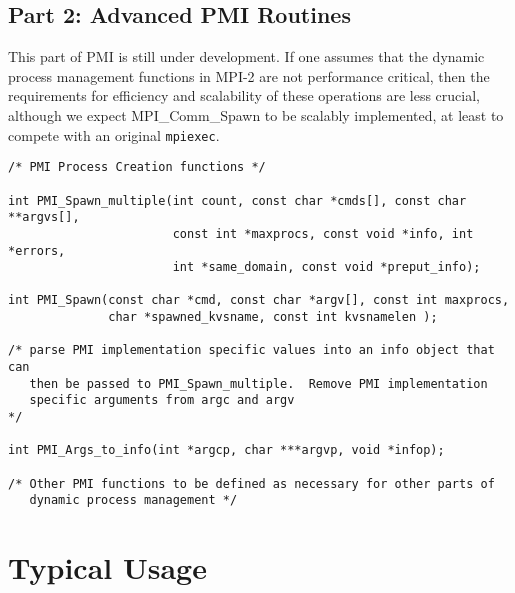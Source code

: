 \documentclass[11pt]{article}
\begin{document}
\subsection{Part 2:  Advanced PMI Routines}
\label{sec:part2}

This part of PMI is still under development.  If one assumes that the
dynamic process management functions in MPI-2 are not performance
critical, then the requirements for efficiency and scalability of these
operations are less crucial, although we expect MPI\_Comm\_Spawn to be
scalably implemented, at least to compete with an original {\tt mpiexec}.

\begin{small}
\begin{verbatim}
/* PMI Process Creation functions */

int PMI_Spawn_multiple(int count, const char *cmds[], const char **argvs[], 
                       const int *maxprocs, const void *info, int *errors, 
                       int *same_domain, const void *preput_info);

int PMI_Spawn(const char *cmd, const char *argv[], const int maxprocs,
              char *spawned_kvsname, const int kvsnamelen );

/* parse PMI implementation specific values into an info object that can
   then be passed to PMI_Spawn_multiple.  Remove PMI implementation
   specific arguments from argc and argv
*/

int PMI_Args_to_info(int *argcp, char ***argvp, void *infop);

/* Other PMI functions to be defined as necessary for other parts of
   dynamic process management */

\end{verbatim}
\end{small}


\section{Typical Usage}
\label{sec:usage}
\end{document}
